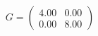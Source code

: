 \documentclass[preview]{standalone}
\begin{document}
\begin{align*}
G = \begin{pmatrix} 4.00 & 0.00 \\ 0.00 & 8.00 \end{pmatrix}
\end{align*}
\end{document}

